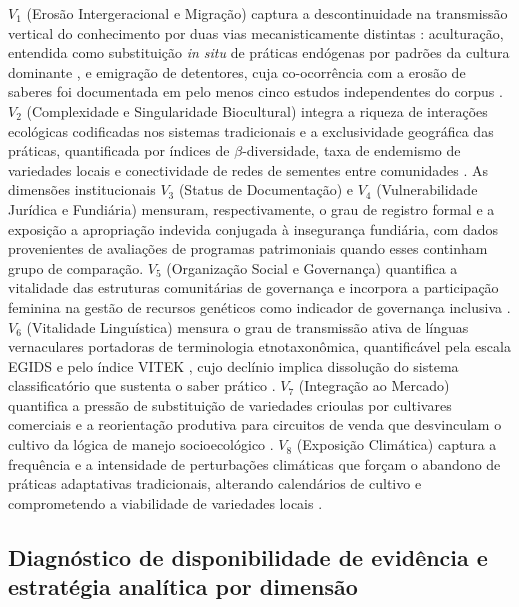 \documentclass[12pt,a4paper]{article}
\begin{document}
$V_1$ (Erosão Intergeracional e Migração) captura a descontinuidade na transmissão vertical do conhecimento por duas vias mecanisticamente distintas \citep{ReyesGarcia2013}: aculturação, entendida como substituição \textit{in situ} de práticas endógenas por padrões da cultura dominante \citep{GomezBaggethun2013}, e emigração de detentores, cuja co-ocorrência com a erosão de saberes foi documentada em pelo menos cinco estudos independentes do corpus \citep{Tran2025,Moller2023,Bastos2022,VazquezDelfin2022,Aniah2019}. $V_2$ (Complexidade e Singularidade Biocultural) integra a riqueza de interações ecológicas codificadas nos sistemas tradicionais \citep{Jarvis2008,Brush2004} e a exclusividade geográfica das práticas, quantificada por índices de $\beta$-diversidade, taxa de endemismo de variedades locais e conectividade de redes de sementes entre comunidades \citep{Sibanda2025}. As dimensões institucionais $V_3$ (Status de Documentação) e $V_4$ (Vulnerabilidade Jurídica e Fundiária) mensuram, respectivamente, o grau de registro formal e a exposição a apropriação indevida conjugada à insegurança fundiária, com dados provenientes de avaliações de programas patrimoniais quando esses continham grupo de comparação. $V_5$ (Organização Social e Governança) quantifica a vitalidade das estruturas comunitárias de governança \citep{Ostrom1990,Pretty2003} e incorpora a participação feminina na gestão de recursos genéticos como indicador de governança inclusiva \citep{Sibanda2025,RomeroSilva2026,MugiNgenga2016}. $V_6$ (Vitalidade Linguística) mensura o grau de transmissão ativa de línguas vernaculares portadoras de terminologia etnotaxonômica, quantificável pela escala EGIDS \citep{LewisSimons2010} e pelo índice VITEK \citep{ZentMaffi2009}, cujo declínio implica dissolução do sistema classificatório que sustenta o saber prático \citep{CamaraLeret2021}. $V_7$ (Integração ao Mercado) quantifica a pressão de substituição de variedades crioulas por cultivares comerciais e a reorientação produtiva para circuitos de venda que desvinculam o cultivo da lógica de manejo socioecológico \citep{Godoy2005,ReyesGarcia2013}. $V_8$ (Exposição Climática) captura a frequência e a intensidade de perturbações climáticas que forçam o abandono de práticas adaptativas tradicionais, alterando calendários de cultivo e comprometendo a viabilidade de variedades locais \citep{Savo2016}.

\subsection{Diagnóstico de disponibilidade de evidência e estratégia analítica por dimensão}
\label{sec:diagnosis}
\end{document}
